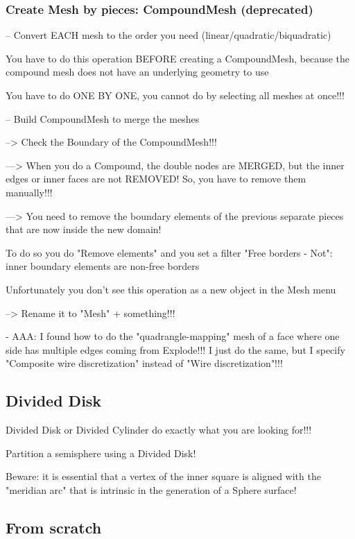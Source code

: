 \documentclass[10pt]{book}
\begin{document}
  
  \subsubsection{Create Mesh by pieces: CompoundMesh (deprecated)}
  
-- Convert EACH mesh to the order you need (linear/quadratic/biquadratic)

  You have to do this operation BEFORE creating a CompoundMesh,
  because the compound mesh does not have an underlying geometry to use 
   
  You have to do ONE BY ONE, you cannot do by selecting all meshes at once!!! 

  
-- Build CompoundMesh to merge the meshes

     --> Check the Boundary of the CompoundMesh!!! 
     
     ---> When you do a Compound, the double nodes are MERGED, but the inner edges or inner faces are not REMOVED! So, you have to remove them manually!!!
     
     ---> You need to remove the boundary elements of the previous separate pieces that are now inside the new domain!
     
          To do so you do "Remove elements" and you set a filter "Free borders - Not": inner boundary elements are non-free borders
          
          Unfortunately you don't see this operation as a new object in the Mesh menu
          
     --> Rename it to "Mesh" + something!!!
     
 
- AAA: I found how to do the "quadrangle-mapping" mesh of a face where one side has multiple edges coming from Explode!!! 
  I just do the same, but I specify "Composite wire discretization" instead of "Wire discretization"!!!
    
 

\subsection{Divided Disk}

Divided Disk or Divided Cylinder do exactly what you are looking for!!!

Partition a semisphere using a Divided Disk!

Beware: it is essential that a vertex of the inner square is aligned with the "meridian arc" that is intrinsic in the generation of a Sphere surface!

\subsection{From scratch}
\end{document}
